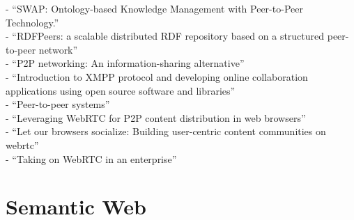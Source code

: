 - ``SWAP: Ontology-based Knowledge Management with Peer-to-Peer Technology.'' \citep{ehrig2003swap} \\
- ``RDFPeers: a scalable distributed RDF repository based on a structured peer-to-peer network'' \citep{cai2004rdfpeers} \\
- ``P2P networking: An information-sharing alternative'' \citep{parameswaran2001p2p} \\
- ``Introduction to XMPP protocol and developing online collaboration applications using open source software and libraries'' \citep{ozturk2010introduction} \\
- ``Peer-to-peer systems'' \citep{rodrigues2010peer} \\
- ``Leveraging WebRTC for P2P content distribution in web browsers'' \citep{vogt2013leveraging} \\
- ``Let our browsers socialize: Building user-centric content communities on webrtc'' \citep{werner2014let} \\
- ``Taking on WebRTC in an enterprise'' \citep{vogt2013leveraging} \\


\section{Semantic Web}
\label{sec:related_semweb}


